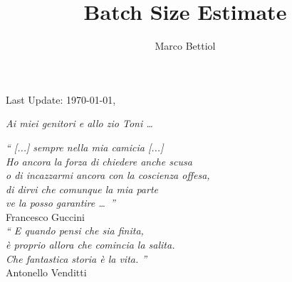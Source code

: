 \documentclass[11pt,a4paper,twoside,openright]{book}
\title{Batch Size Estimate}
\author{Marco Bettiol}
\begin{document}


\thispagestyle{empty}
\clearpage
\null{}
\begin{center}
{\large Last Update: \today,  \ \currenttime}
\end{center}
\null{}


\frontmatter
\cleardoublepage
\begin{flushright}
\null{}
\emph{\large 
Ai miei genitori e allo zio Toni \ldots\\}
\null
\end{flushright}

\cleardoublepage
\begin{flushright}
\null{}
\emph{`` [...] sempre nella mia camicia [...]\\
Ho ancora la forza di chiedere anche scusa\\
o di incazzarmi ancora con la coscienza offesa,\\
di dirvi che comunque la mia parte\\ 
ve la posso garantire \ldots\ ''\\}
{\sc Francesco Guccini\\} 
\null
\emph{`` E quando pensi che sia finita,\\
è proprio allora che comincia la salita.\\ 
Che fantastica storia è la vita.  ''\\}
{\sc Antonello Venditti} 
\null
\end{flushright}
\end{document}
